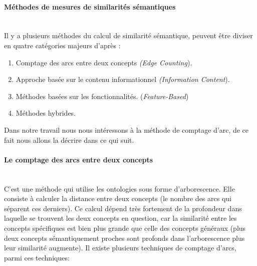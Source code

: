 \documentclass[a4paper,12pt,letterpaper,headsepline,singlespacing,headsepline, french]{report}
\newcommand{\myparagraph}[1]{\paragraph*{#1}\mbox{}\\\indent}
\begin{document}
\myparagraph{Méthodes de mesures de similarités sémantiques}
Il y a plusieurs méthodes du calcul de similarité sémantique,  peuvent être diviser en quatre catégories majeurs d’après \cite{ref14}:
	\begin{enumerate}
		\item Comptage des arcs entre deux concepts \textit{(Edge Counting}).
		\item Approche basée sur le contenu informationnel \textit{(Information Content}).
		\item Méthodes basées sur les fonctionnalités. (\textit{Feature-Based})
		\item Méthodes hybrides.
	\end{enumerate}
Dans notre travail nous nous intéressons à la méthode de comptage d'arc, de ce fait nous allons la décrire dans ce qui suit.
\myparagraph {Le comptage des arcs entre deux concepts}
C’est une méthode qui utilise les ontologies sous forme d’arborescence. Elle consiste à calculer la distance entre deux concepts (le nombre des arcs qui séparent ces derniers). Ce calcul dépend très fortement de la profondeur dans laquelle se trouvent les deux concepts en question, car la similarité entre les concepts spécifiques est bien plus grande que celle des concepts généraux (plus deux concepts sémantiquement proches sont profonds dans l'arborescence plus leur similarité augmente). Il existe plusieurs techniques de comptage d'arcs, parmi ces techniques: 
\end{document}
